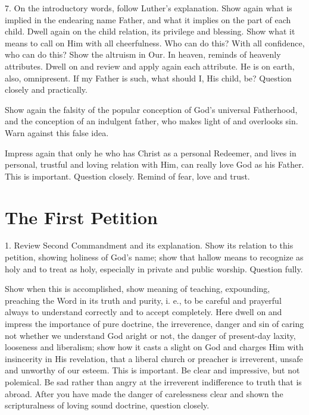 7. On the introductory words, follow Luther’s explanation. Show again what is implied in the endearing name Father, and what it implies on the part of each child. Dwell again on the child relation, its privilege and blessing. Show what it means to call on Him with all cheerfulness. Who can do
this? With all confidence, who can do this? Show the altruism in Our. In heaven, reminds of heavenly attributes. Dwell on and review and apply again each attribute. He is on earth, also, omnipresent. If my Father is such, what should I, His child, be? Question closely and practically.

Show again the falsity of the popular conception of God’s universal Fatherhood, and the conception of an indulgent father, who makes light of and overlooks sin. Warn against this false idea.

Impress again that only he who has Christ as a personal Redeemer, and lives in personal, trustful and loving relation with Him, can really love God as his Father. This is important. Question closely. Remind of fear, love and trust.

\section{The First Petition}

1. Review Second Commandment and its explanation. Show its relation to this petition, showing holiness of God’s name; show that hallow means to recognize as holy and to treat as holy, especially in private and public worship. Question fully.

Show when this is accomplished, show meaning of teaching, expounding, preaching the Word in its truth and purity, i. e., to be careful and prayerful always to understand correctly and to accept completely.  Here dwell on and impress the importance of pure doctrine, the irreverence, danger and sin of
caring not whether we understand God aright or not, the danger of present-day laxity, looseness and liberalism; show how it casts a slight on God and charges Him with insincerity in His revelation, that a liberal church or preacher is irreverent, unsafe and unworthy of our esteem. This is important. Be clear and impressive, but not polemical. Be sad rather than angry at the irreverent indifference to truth that is abroad. After you have made the danger of carelessness clear and shown the scripturalness of loving sound doctrine, question closely.

